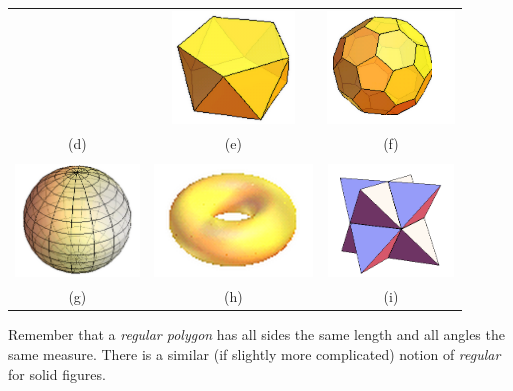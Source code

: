 \documentclass[12pt, reqno]{amsart}
\theoremstyle{remark}
\theoremstyle{definition}
\numberwithin{equation}{section}  %
\begin{document}
\begin{center}
\begin{tabular}{ccc}
\quad
&
\quad
\includegraphics[height=3cm]{pentantiprism}
\quad
&
\quad
\includegraphics[height=3cm]{soccerball}
\quad\\
(d) & (e) & (f)\\
\\
\quad
\includegraphics[height=3cm]{sphere}
\quad
&
\quad
\includegraphics[height=3cm]{torus}
\quad
&
\quad
\includegraphics[height=3cm]{stella}
\quad\\
(g) & (h) & (i)\\
\end{tabular}

\end{center}

\newpage

Remember that a  \emph{regular polygon} has all sides the same length and all angles the same measure.    
There is a similar (if slightly more complicated) notion of \emph{regular} for solid figures.
\end{document}
